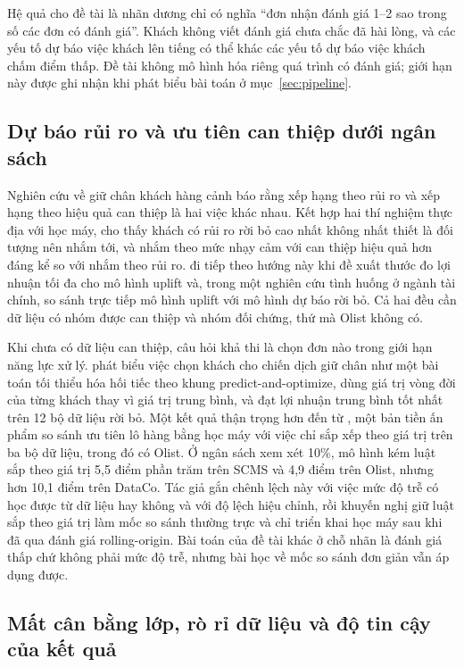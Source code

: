 \documentclass[12pt,a4paper]{report}
\begin{document}
Hệ quả cho đề tài là nhãn dương chỉ có nghĩa ``đơn nhận đánh giá 1--2 sao trong số các đơn có đánh giá''. Khách không viết đánh giá chưa chắc đã hài lòng, và các yếu tố dự báo việc khách lên tiếng có thể khác các yếu tố dự báo việc khách chấm điểm thấp. Đề tài không mô hình hóa riêng quá trình có đánh giá; giới hạn này được ghi nhận khi phát biểu bài toán ở mục~\ref{sec:pipeline}.

\subsection{Dự báo rủi ro và ưu tiên can thiệp dưới ngân sách}\label{sec:rel-targeting}

Nghiên cứu về giữ chân khách hàng cảnh báo rằng xếp hạng theo rủi ro và xếp hạng theo hiệu quả can thiệp là hai việc khác nhau. Kết hợp hai thí nghiệm thực địa với học máy, \textcite{ascarza2018} cho thấy khách có rủi ro rời bỏ cao nhất không nhất thiết là đối tượng nên nhắm tới, và nhắm theo mức nhạy cảm với can thiệp hiệu quả hơn đáng kể so với nhắm theo rủi ro. \textcite{devriendt2021} đi tiếp theo hướng này khi đề xuất thước đo lợi nhuận tối đa cho mô hình uplift và, trong một nghiên cứu tình huống ở ngành tài chính, so sánh trực tiếp mô hình uplift với mô hình dự báo rời bỏ. Cả hai đều cần dữ liệu có nhóm được can thiệp và nhóm đối chứng, thứ mà Olist không có.

Khi chưa có dữ liệu can thiệp, câu hỏi khả thi là chọn đơn nào trong giới hạn năng lực xử lý. \textcite{gomezvargas2025} phát biểu việc chọn khách cho chiến dịch giữ chân như một bài toán tối thiểu hóa hối tiếc theo khung predict-and-optimize, dùng giá trị vòng đời của từng khách thay vì giá trị trung bình, và đạt lợi nhuận trung bình tốt nhất trên 12 bộ dữ liệu rời bỏ. Một kết quả thận trọng hơn đến từ \textcite{li2026valuesorting}, một bản tiền ấn phẩm so sánh ưu tiên lô hàng bằng học máy với việc chỉ sắp xếp theo giá trị trên ba bộ dữ liệu, trong đó có Olist. Ở ngân sách xem xét 10\%, mô hình kém luật sắp theo giá trị 5,5 điểm phần trăm trên SCMS và 4,9 điểm trên Olist, nhưng hơn 10,1 điểm trên DataCo. Tác giả gắn chênh lệch này với việc mức độ trễ có học được từ dữ liệu hay không và với độ lệch hiệu chỉnh, rồi khuyến nghị giữ luật sắp theo giá trị làm mốc so sánh thường trực và chỉ triển khai học máy sau khi đã qua đánh giá rolling-origin. Bài toán của đề tài khác ở chỗ nhãn là đánh giá thấp chứ không phải mức độ trễ, nhưng bài học về mốc so sánh đơn giản vẫn áp dụng được.

\subsection{Mất cân bằng lớp, rò rỉ dữ liệu và độ tin cậy của kết quả}\label{sec:rel-imbalance}
\end{document}
